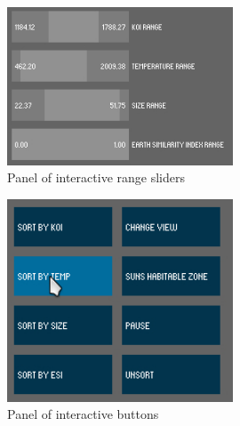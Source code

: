 \begin{figure}[H]
  \centering
      \includegraphics[width=0.6\textwidth]{images/sliders.jpg}
  \caption{Panel of interactive range sliders}
  \label{fig:sliders}
\end{figure}

\begin{figure}[H]
  \centering
      \includegraphics[width=0.6\textwidth]{images/buttons.jpg}
  \caption{Panel of interactive buttons}
  \label{fig:buttons}
\end{figure}

